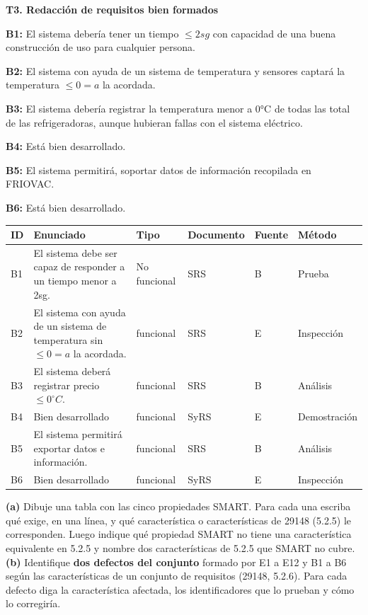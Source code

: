 \documentclass[11pt]{article}
\begin{document}
	
\begin{cajarespuesta}[title={Respuestas del estudiante: T3}]
	\textbf{T3. Redacción de requisitos bien formados}
	
	\textbf{B1:} El sistema debería tener un tiempo $\leq 2sg$ con capacidad de una buena construcción de uso para cualquier persona.
	
	\textbf{B2:} El sistema con ayuda de un sistema de temperatura y sensores captará la temperatura $\leq 0 = a$ la acordada.
	
	\textbf{B3:} El sistema debería registrar la temperatura menor a 0°C de todas las total de las refrigeradoras, aunque hubieran fallas con el sistema eléctrico.
	
	\textbf{B4:} Está bien desarrollado.
	
	\textbf{B5:} El sistema permitirá, soportar datos de información recopilada en FRIOVAC.
	
	\textbf{B6:} Está bien desarrollado.
	
	\begin{longtable}{|p{0.7cm}|p{4cm}|p{1.8cm}|p{1.8cm}|p{1cm}|p{2.5cm}|}
		\hline
		ID & Enunciado & Tipo & Documento & Fuente & Método\\ \hline
		B1 & El sistema debe ser capaz de responder a un tiempo menor a 2sg. & No funcional & SRS & B & Prueba\\ \hline
		B2 & El sistema con ayuda de un sistema de temperatura sin $\leq 0 = a$ la acordada. & funcional & SRS & E & Inspección\\ \hline
		B3 & El sistema deberá registrar precio $\leq 0^\circ C$. & funcional & SRS & B & Análisis\\ \hline
		B4 & Bien desarrollado & funcional & SyRS & E & Demostración\\ \hline
		B5 & El sistema permitirá exportar datos e información. & funcional & SRS & B & Análisis\\ \hline
		B6 & Bien desarrollado & funcional & SyRS & E & Inspección\\ \hline
	\end{longtable}
\end{cajarespuesta}

\begin{cajatarea}[title={T4. Sustento normativo de la calidad \hfill D4 · 20\,\% (junto con las citas de T1 a T3)}]
	\textbf{(a)} Dibuje una tabla con las cinco propiedades SMART. Para cada una escriba qué exige, en una línea, y qué característica o características de 29148 (5.2.5) le corresponden. Luego indique qué propiedad SMART no tiene una característica equivalente en 5.2.5 y nombre dos características de 5.2.5 que SMART no cubre.\\[4pt]
	\textbf{(b)} Identifique \textbf{dos defectos del conjunto} formado por E1 a E12 y B1 a B6 según las características de un conjunto de requisitos (29148, 5.2.6). Para cada defecto diga la característica afectada, los identificadores que lo prueban y cómo lo corregiría.
\end{cajatarea}
\end{document}
